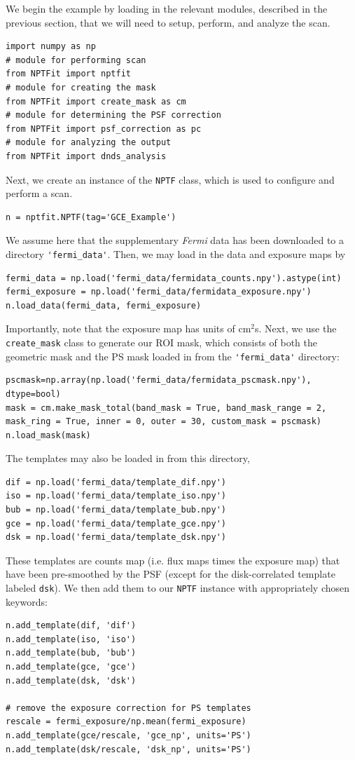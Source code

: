 We begin the example by loading in the relevant modules, described in the previous section, that we will need to setup, perform, and analyze the scan.
\begin{lstlisting}
import numpy as np
# module for performing scan
from NPTFit import nptfit
# module for creating the mask
from NPTFit import create_mask as cm 
# module for determining the PSF correction
from NPTFit import psf_correction as pc 
# module for analyzing the output
from NPTFit import dnds_analysis 
\end{lstlisting}
Next, we create an instance of the \lstinline{NPTF} class, which is used to configure and perform a scan.
\begin{lstlisting}
n = nptfit.NPTF(tag='GCE_Example')
\end{lstlisting}
We assume here that the supplementary {\it Fermi} data has been downloaded to a directory \lstinline{'fermi_data'}.  Then, we may load in the data and exposure maps by 
\begin{lstlisting}
fermi_data = np.load('fermi_data/fermidata_counts.npy').astype(int)
fermi_exposure = np.load('fermi_data/fermidata_exposure.npy')
n.load_data(fermi_data, fermi_exposure)
\end{lstlisting}
Importantly, note that the exposure map has units of cm$^2$s.  Next, we use the \lstinline{create_mask} class to generate our ROI mask, which consists of both the geometric mask and the PS mask loaded in from the \lstinline{'fermi_data'} directory:
\begin{lstlisting}
pscmask=np.array(np.load('fermi_data/fermidata_pscmask.npy'), dtype=bool)
mask = cm.make_mask_total(band_mask = True, band_mask_range = 2, mask_ring = True, inner = 0, outer = 30, custom_mask = pscmask)
n.load_mask(mask)
\end{lstlisting}
The templates may also be loaded in from this directory,
\begin{lstlisting}
dif = np.load('fermi_data/template_dif.npy')
iso = np.load('fermi_data/template_iso.npy')
bub = np.load('fermi_data/template_bub.npy')
gce = np.load('fermi_data/template_gce.npy')
dsk = np.load('fermi_data/template_dsk.npy')
\end{lstlisting}
These templates are counts map (i.e. flux maps times the exposure map) that have been pre-smoothed by the PSF (except for the disk-correlated template labeled \lstinline{dsk}).  We then add them to our \lstinline{NPTF} instance with appropriately chosen keywords:
\begin{lstlisting}
n.add_template(dif, 'dif')
n.add_template(iso, 'iso')
n.add_template(bub, 'bub')
n.add_template(gce, 'gce')
n.add_template(dsk, 'dsk')

# remove the exposure correction for PS templates
rescale = fermi_exposure/np.mean(fermi_exposure)
n.add_template(gce/rescale, 'gce_np', units='PS')
n.add_template(dsk/rescale, 'dsk_np', units='PS')

\end{lstlisting}

